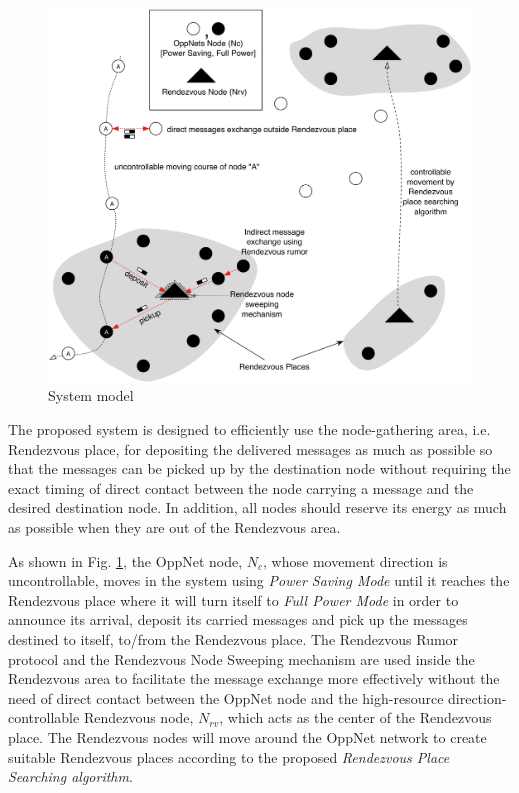 \begin{figure}[h]
	\centering
	\includegraphics[width=5.5in]{Figures/NewSystemModel.pdf}
	\caption{System model}
	\label{System model}
\end{figure}

The proposed system is designed to efficiently use the node-gathering area, i.e. Rendezvous place, for depositing the delivered messages as much as possible so that the messages can be picked up by the destination node without requiring the exact timing of direct contact between the node carrying a message and the desired destination node.
In addition, all nodes should reserve its energy as much as possible when they are out of the Rendezvous area.

As shown in Fig. \ref{System model}, the OppNet node, $N_{c}$, whose movement direction is uncontrollable, moves in the system using \textit{Power Saving Mode}  until it reaches the Rendezvous place where it will turn itself to \emph{Full Power Mode} in order to announce its arrival, deposit its carried messages and pick up the messages destined to itself, to/from the Rendezvous place.
The Rendezvous Rumor protocol and the Rendezvous Node Sweeping mechanism are used inside the Rendezvous area to facilitate the message exchange more effectively without the need of direct contact between the OppNet node and the high-resource direction-controllable Rendezvous node, $N_{rv}$, which acts as the center of the Rendezvous place.
The Rendezvous nodes will move around the OppNet network to create suitable Rendezvous places according to the proposed \emph{Rendezvous Place Searching algorithm}.



